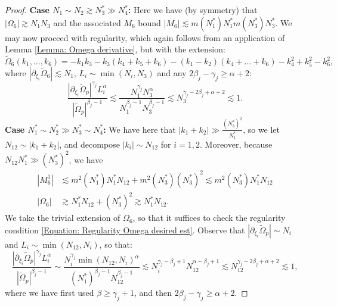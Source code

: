 \documentclass[12pt, letterpaper]{amsart}
\begin{document}
\begin{proof}
    \textbf{Case $N_1\sim N_2\gtrsim N_3^*\gg N_4^*$: } Here we have (by symmetry) that $|\Omega_6|\gtrsim N_1N_3$ and the associated $M_6$ bound $|M_6|\lesssim m(N_1^*)N_1^*m(N_3^*)N_3^*$. We may now proceed with regularity, which again follows from an application of Lemma \ref{Lemma: Omega derivative}, but with the extension:
    \[
        \tilde{\Omega}_6(k_1,\dots, k_6) = -k_1k_3 - k_3(k_4+k_5+k_6)-(k_1-k_2)(k_4+\dots+k_6)-k_4^2+k_5^2-k_6^2,
    \]
    where $|\partial_{\xi_i}\tilde{\Omega}_6|\lesssim N_1$, $L_i \sim \min(N_i, N_3)$ and any $2\beta_j - \gamma_j \geq \alpha +2$:
    \[
    \frac{|\partial_{\xi_i}\tilde{\Omega}_p|^{\gamma_j}L_i^\alpha}{|\tilde{\Omega}_p|^{\beta_j-1}}\lesssim \frac{N_1^{\gamma_j}N_3^{\alpha}}{N_1^{\beta_j-1}N_3^{\beta_j-1}}\lesssim N_3^{\gamma_j-2\beta_j+\alpha+2}\lesssim 1.
    \]
    \textbf{Case $N_1^*\sim N_2^*\gg N_3^*\sim N_4^*$: }We have here that $|k_1+k_2|\gg \tfrac{(N_3^*)^2}{N_1^*}$, so we let $N_{12} \sim |k_1+k_2|$, and decompose $|k_i|\sim N_{12}$ for $i=1,2$. Moreover, because $N_{12}N_1^*\gg (N_3^*)^2$, we have
    \begin{align*}
    |M^1_6|&\lesssim m^2(N_1^*)N_1^*N_{12} + m^2(N_3^*)(N_{3}^*)^2\lesssim m^2(N_3^*)N_1^*N_{12}\\
    |\Omega_6|&\gtrsim N_1^*N_{12} + (N_3^*)^2\gtrsim N_1^*N_{12}.
    \end{align*}
    We take the trivial extension of $\Omega_6$, so that it suffices to check the regularity condition \eqref{Equation: Regularity Omega desired est}. Observe that $|\partial_{\xi_i}\tilde{\Omega}_p|\sim N_i$ and $L_i\sim \min(N_{12}, N_i)$, so that:
    \[
    \frac{|\partial_{\xi_i}\tilde{\Omega}_p|^{\gamma_j}L_i^\alpha}{|\tilde{\Omega}_p|^{\beta_j-1}}\sim \frac{N_i^{\gamma_j}\min(N_{12}, N_i)^\alpha}{(N_1^*)^{\beta_j-1}N_{12}^{\beta_j-1}}\lesssim N_i^{\gamma_j-\beta_j+1}N_{12}^{\alpha - \beta_j + 1}\lesssim N_{12}^{\gamma_j - 2\beta_j+\alpha+2}\lesssim 1,
    \]
    where we have first used $\beta \geq \gamma_j+1$, and then $2\beta_j-\gamma_j\geq \alpha + 2$.
    

\end{proof}
\end{document}
